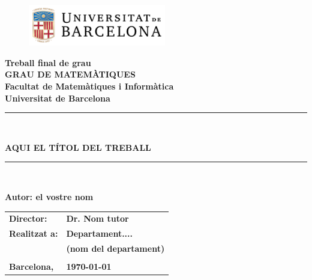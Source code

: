 \documentclass[a4paper,10pt]{book}
\begin{document}
\pagestyle{empty}

\begin{titlepage}
\begin{center}
\begin{figure}[htb]
\begin{center}
\includegraphics[width=6cm]{ub_color.pdf}
\end{center}
\end{figure}

\textbf{\LARGE Treball final de grau} \\
\vspace*{.5cm}
\textbf{\LARGE GRAU DE MATEM\`{A}TIQUES } \\
\vspace*{.5cm}
\textbf{\LARGE Facultat de Matem\`atiques i Inform\`atica\\ Universitat de Barcelona} \\
\vspace*{1.5cm}
\rule{16cm}{0.1mm}\\
\begin{Huge}
\textbf{AQUI EL T\'ITOL DEL TREBALL} \\
\end{Huge}
\rule{16cm}{0.1mm}\\

\vspace{1cm}

\begin{flushright}
\textbf{\LARGE Autor: el vostre nom}

\vspace*{2cm}

\renewcommand{\arraystretch}{1.5}
\begin{tabular}{ll}
\textbf{\Large Director:} & \textbf{\Large Dr. Nom tutor } \\
\textbf{\Large Realitzat a:} & \textbf{\Large  Departament....   } \\
 & \textbf{\Large (nom del departament)} \\
\\
\textbf{\Large Barcelona,} & \textbf{\Large \today }
\end{tabular}

\end{flushright}

\end{center}

\end{titlepage}
\end{document}
